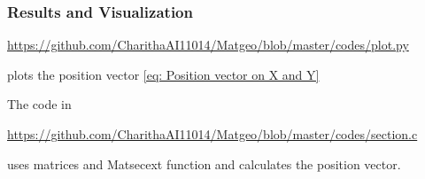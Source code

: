\documentclass{beamer}
\theoremstyle{remark}
\numberwithin{equation}{section}
\begin{document}
\begin{frame}
    \frametitle{Results and Visualization}
    \begin{listings} \url{https://github.com/CharithaAI11014/Matgeo/blob/master/codes/plot.py} 
    \end{listings} plots the position vector \eqref{eq: Position vector on X and Y}

    The code in 
    \begin{listings} \url{https://github.com/CharithaAI11014/Matgeo/blob/master/codes/section.c} 
    \end{listings} 
    uses matrices and Matsecext function and calculates the position vector.
\end{frame}
\end{document}
